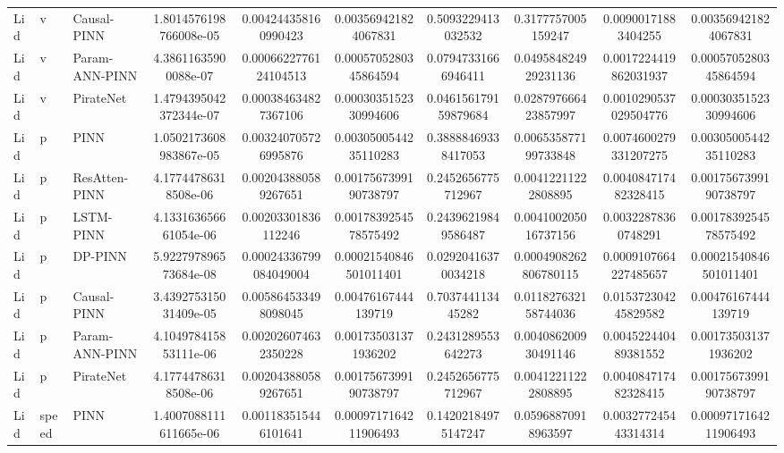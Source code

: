 \begin{landscape}
\begin{longtable}{lllccccccc}
 Lid &     v &    Causal-PINN & 1.8014576198766008e-05 &   0.004244358160990423 &   0.003569421824067831 &   0.5093229413032532 &    0.3177757005159247 &   0.00900171883404255 &   0.003569421824067831 \\
 Lid &     v & Param-ANN-PINN &   4.38611635900088e-07 &  0.0006622776124104513 &  0.0005705280345864594 &  0.07947331666946411 &  0.049584824929231136 & 0.0017224419862031937 &  0.0005705280345864594 \\
 Lid &     v &      PirateNet & 1.4794395042372344e-07 &   0.000384634827367106 &  0.0003035152330994606 & 0.046156179159879684 &  0.028797666423857997 & 0.0010290537029504776 &  0.0003035152330994606 \\
 Lid &     p &           PINN & 1.0502173608983867e-05 &   0.003240705726995876 &  0.0030500544235110283 &  0.38888469338417053 &  0.006535877199733848 & 0.0074600279331207275 &  0.0030500544235110283 \\
 Lid &     p &  ResAtten-PINN &   4.17744786318508e-06 &   0.002043880589267651 &  0.0017567399190738797 &   0.2452656775712967 &   0.00412211222808895 &  0.004084717482328415 &  0.0017567399190738797 \\
 Lid &     p &      LSTM-PINN &  4.133163656661054e-06 &    0.00203301836112246 &  0.0017839254578575492 &  0.24396219849586487 &  0.004100205016737156 &   0.00322878360748291 &  0.0017839254578575492 \\
 Lid &     p &        DP-PINN &  5.922797896573684e-08 & 0.00024336799084049004 & 0.00021540846501011401 &  0.02920416370034218 & 0.0004908262806780115 & 0.0009107664227485657 & 0.00021540846501011401 \\
 Lid &     p &    Causal-PINN &  3.439275315031409e-05 &   0.005864533498098045 &    0.00476167444139719 &    0.703744113445282 &  0.011827632158744036 &  0.015372304245829582 &    0.00476167444139719 \\
 Lid &     p & Param-ANN-PINN &  4.104978415853111e-06 &   0.002026074632350228 &   0.001735031371936202 &   0.2431289553642273 &  0.004086200930491146 &  0.004522440489381552 &   0.001735031371936202 \\
 Lid &     p &      PirateNet &   4.17744786318508e-06 &   0.002043880589267651 &  0.0017567399190738797 &   0.2452656775712967 &   0.00412211222808895 &  0.004084717482328415 &  0.0017567399190738797 \\
 Lid & speed &           PINN & 1.4007088111611665e-06 &   0.001183515446101641 &  0.0009717164211906493 &  0.14202184975147247 &   0.05968870918963597 &  0.003277245443314314 &  0.0009717164211906493 \\

\end{longtable}
\end{landscape}
